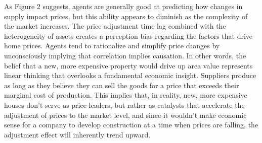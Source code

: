 As Figure 2 suggests, agents are generally good at predicting how changes in supply impact prices, but this ability appears to diminish as the complexity of the market increases. The price adjustment time lag combined with the heterogeneity of assets creates a perception bias regarding the factors that drive home prices. Agents tend to rationalize and simplify price changes by unconsciously implying that correlation implies causation. In other words, the belief that a new, more expensive property would drive up area value represents linear thinking that overlooks a fundamental economic insight. Suppliers produce as long as they believe they can sell the goods for a price that exceeds their marginal cost of production. This implies that, in reality, new, more expensive houses don’t serve as price leaders, but rather as catalysts that accelerate the adjustment of prices to the market level, and since it wouldn’t make economic sense for a company to develop construction  at a time when prices are falling, the adjustment effect will inherently trend upward.\\
